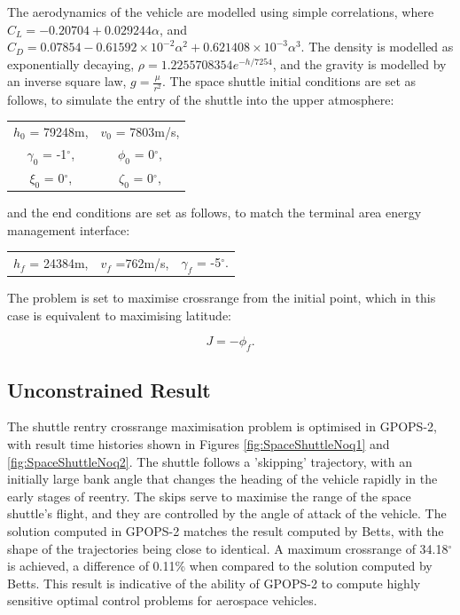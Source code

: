 The aerodynamics of the vehicle are modelled using simple correlations, where $C_L = −0.20704 + 0.029244\alpha$, and $C_D = 0.07854 -0.61592\times10^{-2}\alpha^2 + 0.621408\times10^{-3}\alpha^3$. The density is modelled as exponentially decaying, $\rho = 1.2255708354e^{-h/7254}$, and the gravity is modelled by an inverse square law, $g = \frac{\mu}{r^2}$.
The space shuttle initial conditions are set as follows\cite{Betts2009}, to simulate the entry of the shuttle into the upper atmosphere:
\begin{table}[H]
	\centering
\begin{tabular}{c c}
  $h_0$ =  79248m, & $v_0$ = 7803m/s, \\ 
  $\gamma_0$ =  -1$^\circ$, & $\phi_0$ =  0$^\circ$,\\ 
 $\xi_0$ =  0$^\circ$, & $\zeta_0$ =  0$^\circ$,\\ 
\end{tabular} 
\end{table}
and the end conditions are set as follows\cite{Betts2009}, to match the terminal area energy management interface:
\begin{table}[H]
	\centering
	\begin{tabular}{ c c c}
		   $h_f$ =  24384m, &  $v_f$ =762m/s, & $\gamma_f$ =  -5$^\circ$.\\ 
		
		
	\end{tabular} 
\end{table}

The problem is set to maximise crossrange from the initial point, which in this case is equivalent to maximising latitude:

\begin{equation}
J = -\phi_f.
\end{equation}

\subsection{Unconstrained Result}
The shuttle rentry crossrange maximisation problem is optimised in GPOPS-2, with result time histories shown in Figures \ref{fig:SpaceShuttleNoq1} and \ref{fig:SpaceShuttleNoq2}. The shuttle follows a 'skipping' trajectory, with an initially large bank angle that changes the heading of the vehicle rapidly in the early stages of reentry. The skips serve to maximise the range of the space shuttle's flight, and they are controlled by the angle of attack of the vehicle. The solution computed in GPOPS-2 matches the result computed by Betts\cite{Betts2009}, with the shape of the trajectories being close to identical. A maximum crossrange of 34.18$^\circ$ is achieved, a difference of 0.11\% when compared to the solution computed by Betts\cite{Betts2009}. This result is indicative of the ability of GPOPS-2 to compute highly sensitive optimal control problems for aerospace vehicles. 


